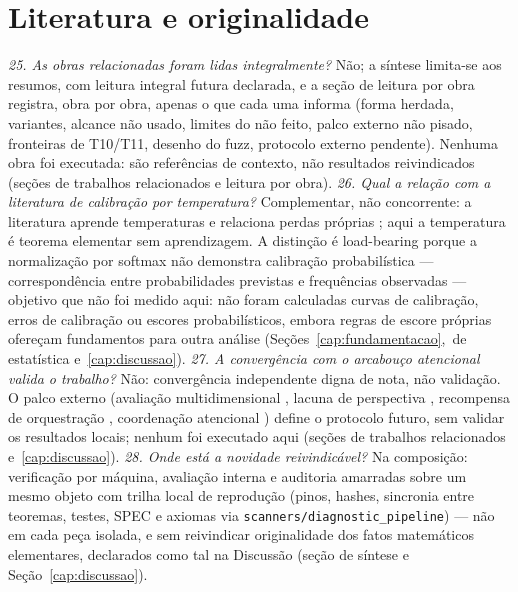 \section{Literatura e originalidade}
\textit{25. As obras relacionadas foram lidas integralmente?} Não; a síntese limita-se aos resumos, com leitura integral futura declarada, e a seção de leitura por obra registra, obra por obra, apenas o que cada uma informa (forma herdada, variantes, alcance não usado, limites do não feito, palco externo não pisado, fronteiras de T10/T11, desenho do fuzz, protocolo externo pendente). Nenhuma obra foi executada: são referências de contexto, não resultados reivindicados (seções de trabalhos relacionados e leitura por obra).
\textit{26. Qual a relação com a literatura de calibração por temperatura?} Complementar, não concorrente: a literatura aprende temperaturas e relaciona perdas próprias \cite{komisarenko2024,xuan2025,xie2024}; aqui a temperatura é teorema elementar sem aprendizagem. A distinção é load-bearing porque a normalização por softmax não demonstra calibração probabilística --- correspondência entre probabilidades previstas e frequências observadas --- objetivo que não foi medido aqui: não foram calculadas curvas de calibração, erros de calibração ou escores probabilísticos, embora regras de escore próprias \cite{gneiting2007} ofereçam fundamentos para outra análise (Seções~\ref{cap:fundamentacao},~de estatística e~\ref{cap:discussao}).
\textit{27. A convergência com o arcabouço atencional valida o trabalho?} Não: convergência independente digna de nota, não validação. O palco externo (avaliação multidimensional \cite{agentbench2023}, lacuna de perspectiva \cite{perspectivegap2026}, recompensa de orquestração \cite{orchrm2026}, coordenação atencional \cite{orchestrator2025}) define o protocolo futuro, sem validar os resultados locais; nenhum foi executado aqui (seções de trabalhos relacionados e~\ref{cap:discussao}).
\textit{28. Onde está a novidade reivindicável?} Na composição: verificação por máquina, avaliação interna e auditoria amarradas sobre um mesmo objeto com trilha local de reprodução (pinos, hashes, sincronia entre teoremas, testes, SPEC e axiomas via \nolinkurl{scanners/diagnostic_pipeline}) --- não em cada peça isolada, e sem reivindicar originalidade dos fatos matemáticos elementares, declarados como tal na Discussão (seção de síntese e Seção~\ref{cap:discussao}).
